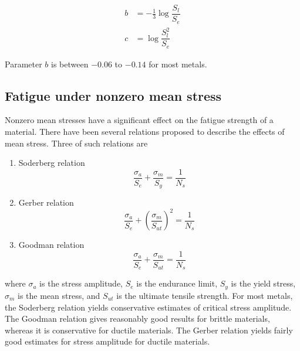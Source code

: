 \documentclass[
10pt,
a4paper,
openany,
svgnames,
]{book} %
\begin{document}
\begin{align*}
  b &= - \frac{1}{3} \log \dfrac{S_l}{S_e} \\
  c &= \log \dfrac{S_l^2}{S_e}
\end{align*}

Parameter $b$ is between $-0.06$ to $-0.14$ for most metals.

\subsection{Fatigue under nonzero mean stress}

Nonzero mean stresses have a significant effect on the fatigue strength of a material. There have been several relations proposed to describe the effects of mean stress. Three of such relations are

\begin{enumerate}
\item Soderberg relation
  \begin{equation}
    \frac{\sigma_a}{S_e} + \frac{\sigma _m}{S_y} = \frac{1}{N_s}
  \end{equation}
\item Gerber relation
  \begin{equation}
    \frac{\sigma_a}{S_e} + \left( \frac{\sigma_m}{S_{ut}} \right)^2 = \frac{1}{N_s}
  \end{equation}
\item Goodman relation
  \begin{equation}
    \frac{\sigma_a}{S_e} + \frac{\sigma _m}{S_{ut}} = \frac{1}{N_s}
  \end{equation}
\end{enumerate}

where $\sigma_a$ is the stress amplitude, $S_e$ is the endurance limit, $S_y$ is the yield stress, $\sigma_m$ is the mean stress, and $S_{ut}$ is the ultimate tensile strength. For most metals, the Soderberg relation yields conservative estimates of critical stress amplitude. The Goodman relation gives reasonably good results for brittle materials, whereas it is conservative for ductile materials. The Gerber relation yields fairly good estimates for stress amplitude for ductile materials.
\end{document}
